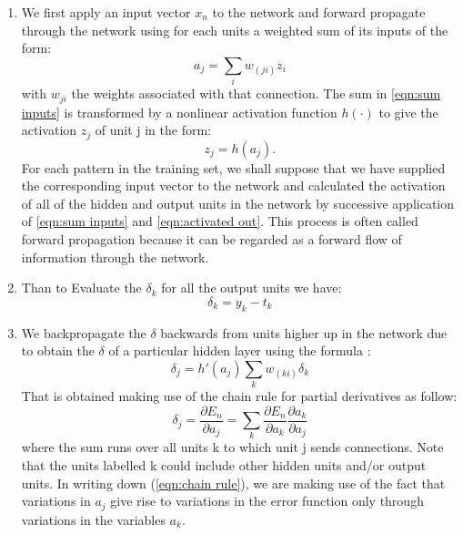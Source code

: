 \documentclass[a4paper, 10pt]{book}
\begin{document}
\begin{enumerate}

\item	We first apply an input vector $x_n$ to the network and forward propagate through the network
 using for each units a weighted sum of its inputs of the form:
\begin{equation}
    \label{eqn:sum inputs}
 a_j = \sum\limits_{i} w_(ji)z_i   
\end{equation}
with $w_{ji}$ the weights associated with that connection.
The sum in \ref{eqn:sum inputs} is
transformed by a nonlinear activation function $h(\cdot)$  to give the activation $z_j$ of unit j
in the form:
\begin{equation}
    \label{eqn:activated out}
z_j = h(a_j).                       
\end{equation}
For each pattern in the training set, we shall suppose that we have supplied the corresponding input vector to the network and calculated the activation of all of the hidden and output units 
in the network by successive application of \ref{eqn:sum inputs} and \ref{eqn:activated out}. This process is often called forward
propagation because it can be regarded as a forward flow of information through the network.
	
\item	Than   to Evaluate the $\delta_k$ for all the output units we have:
 \begin{equation}
     \label{eqn:delta}
 \delta_k = y_k − t_k  
 \end{equation}
\item	We backpropagate the $\delta $ backwards from units higher up in the network due to obtain the $\delta$ of a particular hidden layer using the formula :
\begin{equation}
    \label{eqn:delta hidden layer}
    \delta_j = h'(a_j)\sum\limits_{k} w_(ki)\delta_k  
  \end{equation}
    That is obtained making use of the chain rule for partial derivatives as follow:
    \begin{equation}
        \label{eqn:chain rule}
   \delta_j =\frac{\partial E_n}{\partial a_j} = \sum\limits_{k}\frac{\partial E_n}{\partial a_k} \frac{\partial a_k}{\partial a_j}
  \end{equation}
    where the sum runs over all units k to which unit j sends connections. Note that the units labelled k could include other hidden units and/or output units. 
    In writing down (\ref{eqn:chain rule}), we are making use of the fact that variations in $a_j$ give rise to variations in the error function only through variations in the variables $a_k$.


\end{enumerate}
\end{document}
